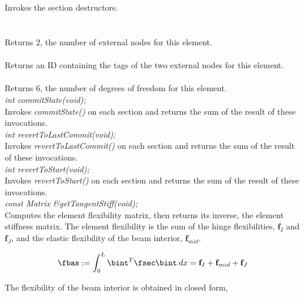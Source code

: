 \\
\\ 
Invokes the section destructors. \\

  \\
 \\
Returns 2, the number of external nodes for this element. \\

 \\
Returns an ID containing the tags of the two external nodes for this element. \\

\\
Returns 6, the number of degrees of freedom for this element. \\ 

{\em int commitState(void);} \\
Invokes {\em commitState()} on each section and returns the sum of the result of
these invocations. \\

{\em int revertToLastCommit(void);} \\
Invokes {\em revertToLastCommit()} on each section and returns the sum of the result of
these invocations. \\

{\em int revertToStart(void);} \\
Invokes {\em revertToStart()} on each section and returns the sum of the result of
these invocations. \\

{\em const Matrix \&getTangentStiff(void);} \\
Computes the element flexibility matrix, then returns its inverse, the element
stiffness matrix. The element flexibility is the sum of the hinge flexibilities,
$\mathbf{f}_I$ and $\mathbf{f}_J$, and the elastic flexibility of the beam interior,
$\mathbf{f}_{mid}$.

\begin{equation}
\label{eq:fele}
\fbas := \int_{0}^{L}{\bint^T \fsec \bint \: dx} = \mathbf{f}_I + \mathbf{f}_{mid} + \mathbf{f}_J
\end{equation}

The flexibility of the beam interior is obtained in closed form,

